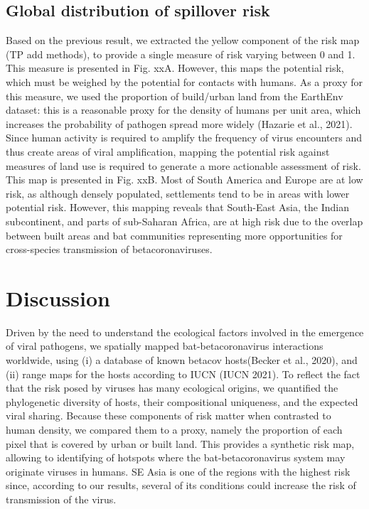 \documentclass[11pt]{article}
\begin{document}
\hypertarget{global-distribution-of-spillover-risk}{%
\subsection{Global distribution of spillover
risk}\label{global-distribution-of-spillover-risk}}

Based on the previous result, we extracted the yellow component of the
risk map (TP add methods), to provide a single measure of risk varying
between 0 and 1. This measure is presented in Fig. xxA. However, this
maps the potential risk, which must be weighed by the potential for
contacts with humans. As a proxy for this measure, we used the
proportion of build/urban land from the EarthEnv dataset: this is a
reasonable proxy for the density of humans per unit area, which
increases the probability of pathogen spread more widely (Hazarie et
al., 2021). Since human activity is required to amplify the frequency of
virus encounters and thus create areas of viral amplification, mapping
the potential risk against measures of land use is required to generate
a more actionable assessment of risk. This map is presented in Fig. xxB.
Most of South America and Europe are at low risk, as although densely
populated, settlements tend to be in areas with lower potential risk.
However, this mapping reveals that South-East Asia, the Indian
subcontinent, and parts of sub-Saharan Africa, are at high risk due to
the overlap between built areas and bat communities representing more
opportunities for cross-species transmission of betacoronaviruses.

\hypertarget{discussion}{%
\section{Discussion}\label{discussion}}

Driven by the need to understand the ecological factors involved in the
emergence of viral pathogens, we spatially mapped bat-betacoronavirus
interactions worldwide, using (i) a database of known betacov
hosts(Becker et al., 2020), and (ii) range maps for the hosts according
to IUCN (IUCN 2021). To reflect the fact that the risk posed by viruses
has many ecological origins, we quantified the phylogenetic diversity of
hosts, their compositional uniqueness, and the expected viral sharing.
Because these components of risk matter when contrasted to human
density, we compared them to a proxy, namely the proportion of each
pixel that is covered by urban or built land. This provides a synthetic
risk map, allowing to identifying of hotspots where the
bat-betacoronavirus system may originate viruses in humans. SE Asia is
one of the regions with the highest risk since, according to our
results, several of its conditions could increase the risk of
transmission of the virus.
\end{document}

